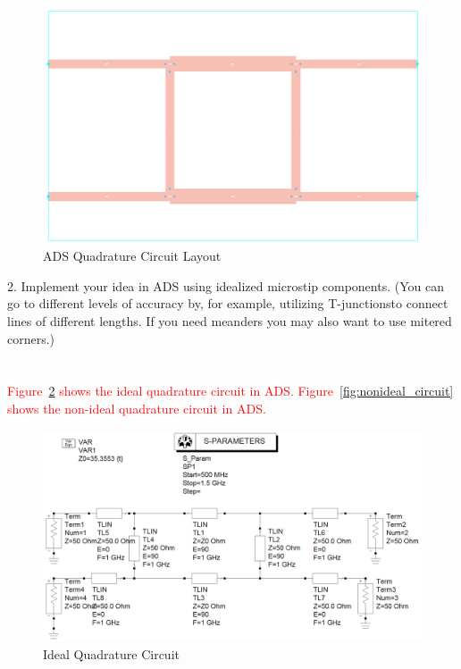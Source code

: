 \documentclass[conference]{IEEEtran}
\begin{document}
\begin{figure}[!htb]
\centering
\includegraphics[scale=0.25]{ads-layout.png}
\caption{ADS Quadrature Circuit Layout}
\label{fig:ads_layout}
\end{figure}
2. Implement your idea in ADS using idealized microstip components. (You can go to different levels of accuracy by, for example, utilizing T-junctionsto connect lines of different lengths. If you need meanders you may also want to use mitered corners.)\\\\\\
\textcolor{red}{ Figure~\ref{fig:ideal_circuit} shows the ideal quadrature circuit in ADS.  Figure~\ref{fig:nonideal_circuit} shows the non-ideal quadrature circuit in ADS.}\\
\begin{figure}[!htb]
\centering
\includegraphics[scale=0.25]{quadrature-ideal-circuit.png}
\caption{Ideal Quadrature Circuit}
\label{fig:ideal_circuit}
\end{figure}
\end{document}

